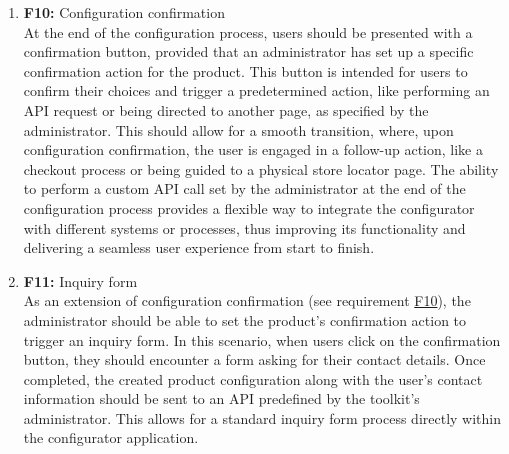 \begin{enumerate}
\item \textbf{F10:} \label{itm:F10} Configuration confirmation
\vspace{2pt}
\\At the end of the configuration process, users should be presented with a confirmation button, provided that an administrator has set up a specific confirmation action for the product. This button is intended for users to confirm their choices and trigger a predetermined action, like performing an API request or being directed to another page, as specified by the administrator. This should allow for a smooth transition, where, upon configuration confirmation, the user is engaged in a follow-up action, like a checkout process or being guided to a physical store locator page. The ability to perform a custom API call set by the administrator at the end of the configuration process provides a flexible way to integrate the configurator with different systems or processes, thus improving its functionality and delivering a seamless user experience from start to finish.
\vspace{4pt}

\item \textbf{F11:} Inquiry form \label{itm:F11}
\vspace{2pt}
\\As an extension of configuration confirmation (see requirement \hyperref[itm:F10]{F10}), the administrator should be able to set the product's confirmation action to trigger an inquiry form. In this scenario, when users click on the confirmation button, they should encounter a form asking for their contact details. Once completed, the created product configuration along with the user's contact information should be sent to an API predefined by the toolkit's administrator. This allows for a standard inquiry form process directly within the configurator application.
\vspace{4pt}


\end{enumerate}
